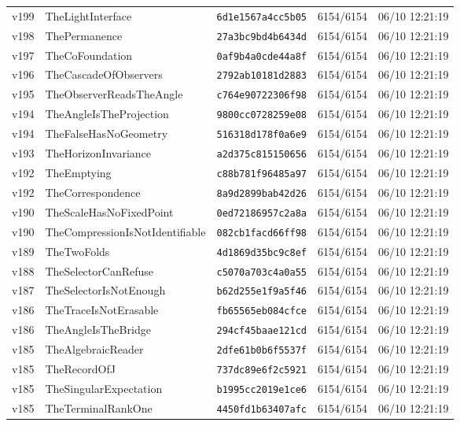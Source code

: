\documentclass[11pt]{article}
\theoremstyle{definition}\newtheorem{deriv}{Derivation}
\begin{document}
{\begin{longtable}{@{}lllll@{}}
v199 & TheLightInterface & \texttt{6d1e1567a4cc5b05} & 6154/6154 & 06/10 12:21:19 \\
v198 & ThePermanence & \texttt{27a3bc9bd4b6434d} & 6154/6154 & 06/10 12:21:19 \\
v197 & TheCoFoundation & \texttt{0af9b4a0cde44a8f} & 6154/6154 & 06/10 12:21:19 \\
v196 & TheCascadeOfObservers & \texttt{2792ab10181d2883} & 6154/6154 & 06/10 12:21:19 \\
v195 & TheObserverReadsTheAngle & \texttt{c764e90722306f98} & 6154/6154 & 06/10 12:21:19 \\
v194 & TheAngleIsTheProjection & \texttt{9800cc0728259e08} & 6154/6154 & 06/10 12:21:19 \\
v194 & TheFalseHasNoGeometry & \texttt{516318d178f0a6e9} & 6154/6154 & 06/10 12:21:19 \\
v193 & TheHorizonInvariance & \texttt{a2d375c815150656} & 6154/6154 & 06/10 12:21:19 \\
v192 & TheEmptying & \texttt{c88b781f96485a97} & 6154/6154 & 06/10 12:21:19 \\
v192 & TheCorrespondence & \texttt{8a9d2899bab42d26} & 6154/6154 & 06/10 12:21:19 \\
v190 & TheScaleHasNoFixedPoint & \texttt{0ed72186957c2a8a} & 6154/6154 & 06/10 12:21:19 \\
v190 & TheCompressionIsNotIdentifiable & \texttt{082cb1facd66ff98} & 6154/6154 & 06/10 12:21:19 \\
v189 & TheTwoFolds & \texttt{4d1869d35bc9c8ef} & 6154/6154 & 06/10 12:21:19 \\
v188 & TheSelectorCanRefuse & \texttt{c5070a703c4a0a55} & 6154/6154 & 06/10 12:21:19 \\
v187 & TheSelectorIsNotEnough & \texttt{b62d255e1f9a5f46} & 6154/6154 & 06/10 12:21:19 \\
v186 & TheTraceIsNotErasable & \texttt{fb65565eb084cfce} & 6154/6154 & 06/10 12:21:19 \\
v186 & TheAngleIsTheBridge & \texttt{294cf45baae121cd} & 6154/6154 & 06/10 12:21:19 \\
v185 & TheAlgebraicReader & \texttt{2dfe61b0b6f5537f} & 6154/6154 & 06/10 12:21:19 \\
v185 & TheRecordOfJ & \texttt{737dc89e6f2c5921} & 6154/6154 & 06/10 12:21:19 \\
v185 & TheSingularExpectation & \texttt{b1995cc2019e1ce6} & 6154/6154 & 06/10 12:21:19 \\
v185 & TheTerminalRankOne & \texttt{4450fd1b63407afc} & 6154/6154 & 06/10 12:21:19 \\

\end{longtable}}
\end{document}
